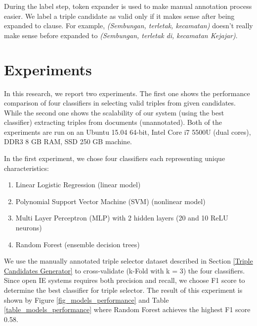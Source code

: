 \documentclass[peerreview,12pt]{IEEEtran}
\begin{document}
During the label step, token expander is used to make manual annotation process easier. We label a triple candidate as valid only if it makes sense after being expanded to clause. For example, \textit{(Sembungan, terletak, kecamatan)} doesn't really make sense before expanded to \textit{(Sembungan, terletak di, kecamatan Kejajar)}.

\section{Experiments} \label{Experiments}

In this research, we report two experiments. The first one shows the performance comparison of four classifiers in selecting valid triples from given candidates. While the second one shows the scalability of our system (using the best classifier) extracting triples from documents (unannotated). Both of the experiments are run on an Ubuntu 15.04 64-bit, Intel Core i7 5500U (dual cores), DDR3 8 GB RAM, SSD 250 GB machine.

In the first experiment, we chose four classifiers each representing unique characteristics: 

\begin{enumerate}
\item Linear Logistic Regression\cite{fan2008liblinear} (linear model)
\item Polynomial Support Vector Machine (SVM)\cite{chang2011libsvm} (nonlinear model)
\item Multi Layer Perceptron (MLP)\cite{hinton1989connectionist} with 2 hidden layers (20 and 10 ReLU\cite{nair2010rectified} neurons)
\item Random Forest\cite{wasserman2015grid} (ensemble decision trees)
\end{enumerate}
  
We use the manually annotated triple selector dataset described in Section \ref{Triple Candidates Generator} to cross-validate\cite{kohavi1995study} (k-Fold with k = 3) the four classifiers. Since open IE systems requires both precision and recall\cite{angeli2015leveraging}, we choose F1 score to determine the best classifier for triple selector. The result of this experiment is shown by Figure \ref{fig_models_performance} and Table \ref{table_models_performance} where Random Forest achieves the highest F1 score 0.58.
\end{document}
